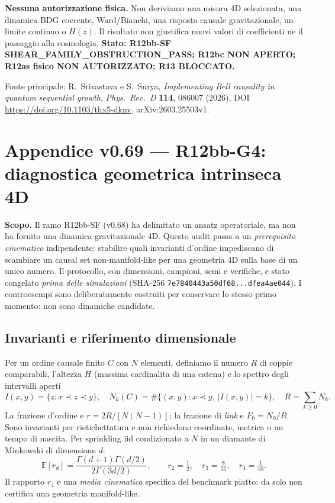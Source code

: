 \documentclass[11pt,a4paper]{article}
\begin{document}
\textbf{Nessuna autorizzazione fisica.} Non deriviamo una misura 4D selezionata, una dinamica BDG coerente, Ward/Bianchi, una risposta causale gravitazionale, un limite continuo o $H(z)$. Il risultato non giustifica nuovi valori di coefficienti ne il passaggio alla cosmologia. \textbf{Stato: R12bb-SF SHEAR\_FAMILY\_OBSTRUCTION\_PASS; R12bc NON APERTO; R12as fisico NON AUTORIZZATO; R13 BLOCCATO.}

Fonte principale: R.~Srivastava e S.~Surya, \emph{Implementing Bell causality in quantum sequential growth}, \emph{Phys.~Rev.~D} \textbf{114}, 086007 (2026), DOI \url{https://doi.org/10.1103/thx5-dknv}, arXiv:2603.25503v1.


\clearpage
\section*{Appendice v0.69 --- R12bb-G4: diagnostica geometrica intrinseca 4D}
\textbf{Scopo.} Il ramo R12bb-SF (v0.68) ha delimitato un ansatz operatoriale, ma non ha fornito una dinamica gravitazionale 4D. Questo audit passa a un \emph{prerequisito cinematico} indipendente: stabilire quali invarianti d'ordine impediscano di scambiare un causal set non-manifold-like per una geometria 4D sulla base di un unico numero. Il protocollo, con dimensioni, campioni, semi e verifiche, e stato congelato \emph{prima delle simulazioni} (SHA-256 \texttt{7e7840443a50df68...dfea4ae044}). I controesempi sono deliberatamente costruiti per conservare lo stesso primo momento: non sono dinamiche candidate.

\subsection*{Invarianti e riferimento dimensionale}
Per un ordine causale finito $C$ con $N$ elementi, definiamo il numero $R$ di coppie comparabili, l'altezza $H$ (massima cardinalita di una catena) e lo spettro degli intervalli aperti
\begin{equation}
 I(x,y)=\{z:x\prec z\prec y\},\quad N_k(C)=\#\{(x,y):x\prec y,\ |I(x,y)|=k\},\quad R=\sum_{k\ge0}N_k.
 \tag{G4.1}
\end{equation}
La frazione d'ordine e $r=2R/[N(N-1)]$; la frazione di \emph{link} e $F_0=N_0/R$. Sono invarianti per rietichettatura e non richiedono coordinate, metrica o un tempo di nascita. Per sprinkling iid condizionato a $N$ in un diamante di Minkowski di dimensione $d$:
\begin{equation}
 \mathbb E[r_d]=\frac{\Gamma(d+1)\Gamma(d/2)}{2\Gamma(3d/2)},\qquad
 r_2=\tfrac12,\quad r_3=\tfrac8{35},\quad \boxed{r_4=\tfrac1{10}}.\tag{G4.2}
\end{equation}
Il rapporto $r_4$ e una \emph{media cinematica} specifica del benchmark piatto: da solo non certifica una geometria manifold-like.
\end{document}
